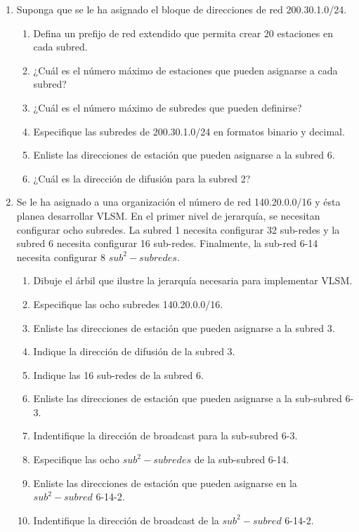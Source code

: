 \begin{enumerate}
    \item Suponga que se le ha asignado el bloque de direcciones de red 200.30.1.0/24.
    \begin{enumerate}
        \item Defina un prefijo de red extendido que permita crear 20 estaciones en cada subred.
        \item ¿Cu\'al es el n\'umero m\'aximo de estaciones que pueden asignarse a cada subred?
        \item ¿Cu\'al es el n\'umero m\'aximo de subredes que pueden definirse?
        \item Especifique las subredes de 200.30.1.0/24 en formatos binario y decimal.
        \item Enliste las direcciones de estaci\'on que pueden asignarse a la subred 6.
        \item ¿Cu\'al es la direcci\'on de difusi\'on para la subred 2?
    \end{enumerate}

    \item Se le ha asignado a una organizaci\'on el n\'umero de red 140.20.0.0/16 y \'esta planea desarrollar VLSM. En el primer
    nivel de jerarqu\'ia, se necesitan configurar ocho subredes. La subred 1 necesita configurar 32 sub-redes y la subred 6
    necesita configurar 16 sub-redes. Finalmente, la sub-red 6-14 necesita configurar 8 \(sub^2-subredes\).
    \begin{enumerate}
        \item Dibuje el \'arbil que ilustre la jerarqu\'ia necesaria para implementar VLSM.
        \item Especifique las ocho subredes 140.20.0.0/16.
        \item Enliste las direcciones de estaci\'on que pueden asignarse a la subred 3.
        \item Indique la direcci\'on de difusi\'on de la subred 3.
        \item Indique las 16 sub-redes de la subred 6.
        \item Enliste las direcciones de estaci\'on que pueden asignarse a la sub-subred 6-3.
        \item Indentifique la direcci\'on de broadcast para la sub-subred 6-3.
        \item Especifique las ocho \(sub^2-subredes\) de la sub-subred 6-14.
        \item Enliste las direcciones de estaci\'on que pueden asignarse en la \(sub^2-subred\) 6-14-2.
        \item Indentifique la direcci\'on de broadcast de la \(sub^2-subred\) 6-14-2.
    \end{enumerate}


\end{enumerate}
